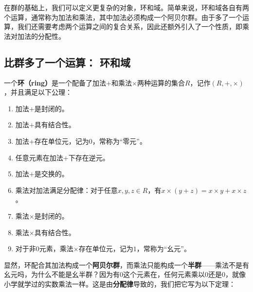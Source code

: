 
\begin{issues}
\issueDraft
{}
\end{issues}



在群的基础上，我们可以定义更复杂的对象，环和域。简单来说，环和域各自有两个运算，通常称为加法和乘法，其中加法必须构成一个阿贝尔群。由于多了一个运算，我们还需要考虑两个运算之间的复合关系，因此还额外引入了一个性质，即乘法对加法的分配性。

\subsection{比群多了一个运算： 环和域}



\begin{defi}\label{Ring, Definition}
一个\textbf{环（ring）}是一个配备了加法$+$和乘法$\times$两种运算的集合$R$，记作$(R, +, \times)$，并且满足以下公理：
\begin{enumerate}
    \item 加法$+$是封闭的。
    \item 加法$+$具有结合性。
    \item 加法$+$存在单位元，记为$0$，常称为“零元”。
    \item 任意元素在加法$+$下存在逆元。
    \item 加法$+$是交换的。
    \item 乘法对加法满足分配律：对于任意$x, y, z\in R$，有$x\times(y+z)=x\times y+x\times z$。
    \item 乘法$\times$是封闭的。
    \item 乘法$\times$具有结合性。
    \item 对于非$0$元素，乘法$\times$存在单位元，记为$1$，常称为“幺元”。
\end{enumerate}
\end{defi}


显然，环配合其加法构成一个\textbf{阿贝尔群}，而乘法只能构成一个\textbf{半群}——乘法不是有幺元吗，为什么不能是幺半群？因为有$0$这个元素在，任何元素乘以$0$还是$0$，就像小学就学过的实数乘法一样。这是由\textbf{分配律}导致的，我们把它写为以下定理：

